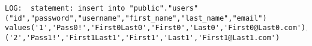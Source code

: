 \begin{lstlisting}[caption={Log of Django initial user population creation},breaklines=true,label={lst:djangoPopulateLog}]
    LOG:  statement: insert into "public"."users"("id","password","username","first_name","last_name","email") values('1','Pass0!','First0Last0','First0','Last0','First0@Last0.com'),('2','Pass1!','First1Last1','First1','Last1','First1@Last1.com')
\end{lstlisting}
